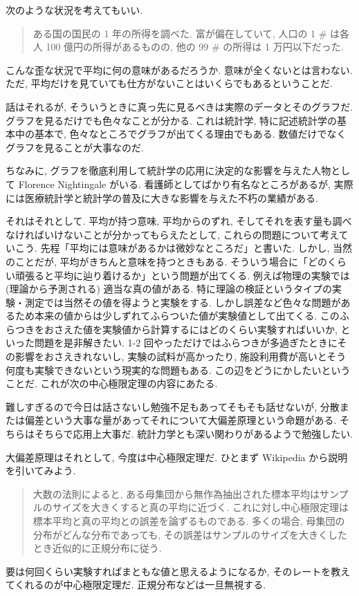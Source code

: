 \documentclass[openany, a4paper, oneside]{jsbook}
\begin{document}
次のような状況を考えてもいい.
\begin{quote}
ある国の国民の 1 年の所得を調べた.
富が偏在していて, 人口の 1 \#  は各人 100 億円の所得があるものの,
他の 99 \#  の所得は 1 万円以下だった.
\end{quote}
こんな歪な状況で平均に何の意味があるだろうか.
意味が全くないとは言わない.
ただ, 平均だけを見ていても仕方がないことはいくらでもあるということだ.

話はそれるが, そういうときに真っ先に見るべきは実際のデータとそのグラフだ.
グラフを見るだけでも色々なことが分かる.
これは統計学, 特に記述統計学の基本中の基本で, 色々なところでグラフが出てくる理由でもある.
数値だけでなくグラフを見ることが大事なのだ.

ちなみに, グラフを徹底利用して統計学の応用に決定的な影響を与えた人物として Florence Nightingale がいる.
看護師としてばかり有名なところがあるが, 実際には医療統計学と統計学の普及に大きな影響を与えた不朽の業績がある.

それはそれとして.
平均が持つ意味, 平均からのずれ, そしてそれを表す量も調べなければいけないことが分かってもらえたとして,
これらの問題について考えていこう.
先程「平均には意味があるかは微妙なところだ」と書いた.
しかし, 当然のことだが, 平均がきちんと意味を持つときもある.
そういう場合に「どのくらい頑張ると平均に辿り着けるか」という問題が出てくる.
例えば物理の実験では (理論から予測される) 適当な真の値がある.
特に理論の検証というタイプの実験・測定では当然その値を得ようと実験をする.
しかし誤差など色々な問題があるため本来の値からは少しずれてふらついた値が実験値として出てくる.
このふらつきをおさえた値を実験値から計算するにはどのくらい実験すればいいか, といった問題を是非解きたい.
1-2 回やっただけではふらつきが多過ぎたときにその影響をおさえきれないし,
実験の試料が高かったり, 施設利用費が高いとそう何度も実験できないという現実的な問題もある.
この辺をどうにかしたいということだ.
これが次の中心極限定理の内容にあたる.

難しすぎるので今日は話さないし勉強不足もあってそもそも話せないが,
分散または偏差という大事な量があってそれについて大偏差原理という命題がある.
そちらはそちらで応用上大事だ.
統計力学とも深い関わりがあるようで勉強したい.

大偏差原理はそれとして, 今度は中心極限定理だ.
ひとまず Wikipedia から説明を引いてみよう.
\begin{quote}
大数の法則によると, ある母集団から無作為抽出された標本平均はサンプルのサイズを大きくすると真の平均に近づく.
これに対し中心極限定理は標本平均と真の平均との誤差を論ずるものである.
多くの場合, 母集団の分布がどんな分布であっても, その誤差はサンプルのサイズを大きくしたとき近似的に正規分布に従う.
\end{quote}
要は何回くらい実験すればまともな値と思えるようになるか, そのレートを教えてくれるのが中心極限定理だ.
正規分布などは一旦無視する.
\end{document}
